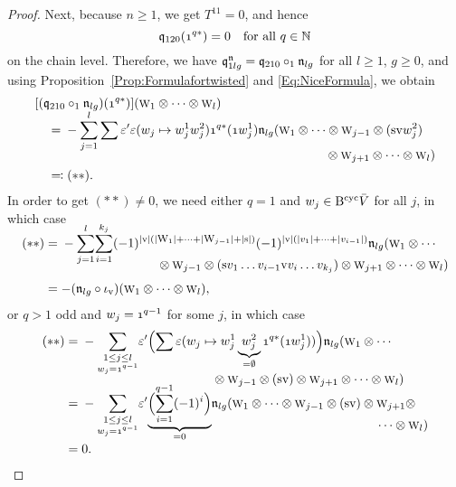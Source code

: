 \documentclass[\MainFolder/Text.tex]{subfiles}
\begin{document}
\begin{proof}
Next, because $n\ge 1$, we get $T^{11} = 0$, and hence 
$$ \OPQ_{120}(\NOne^{q*}) = 0\quad\text{for all }q\in \N$$
on the chain level. Therefore, we have $\mathfrak{q}_{1lg}^{\mathfrak{n}} = \mathfrak{q}_{210}\circ_1 \mathfrak{n}_{lg}$ for all $l\ge 1$, $g\ge 0$, and  using Proposition~\ref{Prop:Formulafortwisted} and \eqref{Eq:NiceFormula}, we obtain 
\allowdisplaybreaks
\begin{align*}
&[(\OPQ_{210}\circ_1 \PMC_{lg})(\NOne^{q*})](\W_1 \otimes \dotsb \otimes \W_l) \\[\jot]
&\quad= \begin{multlined}[t]-\smash{\sum_{j=1}^l} \sum \varepsilon' \varepsilon(w_j \mapsto w_j^1 w_j^2) \NOne^{q*}(\NOne w_j^1) \PMC_{lg}(\W_1 \otimes \dotsb \otimes \W_{j-1} \otimes (\Susp \NVol w_j^2) \\[\jot] \otimes \W_{j+1}\otimes \dotsb \otimes \W_l)\end{multlined}\\
&\quad\eqqcolon(**).
\end{align*}
In order to get $(**)\neq 0$, we need either $q=1$ and $w_j \in \mathrm{B}^{\mathrm{cyc}} \bar{V}$ for all $j$, in which case
\allowdisplaybreaks
\begin{align*}
(**) &= \begin{multlined}[t]-\smash{\sum_{j=1}^l} \smash{\sum_{i=1}^{k_j}} (-1)^{\Abs{\NVol}(\Abs{\W_1}+ \dotsb + \Abs{\W_{j-1}} + \Abs{\Susp})}(-1)^{\Abs{\NVol}(\Abs{v_1} + \dotsb + \Abs{v_{i-1}})}\PMC_{lg}(\W_1 \otimes \dotsb \\[\jot] \otimes \W_{j-1} \otimes (\Susp v_1 \dots v_{i-1} \NVol v_{i} \dots v_{k_j}) \otimes \W_{j+1}\otimes \dotsb\otimes \W_l)\end{multlined} \\[\jot]
 &= -(\PMC_{lg} \circ \iota_\NVol)(\W_1 \otimes \dotsb \otimes \W_l),
\end{align*}
or $q>1$ odd and $w_j = \NOne^{q-1}$ for some $j$, in which case
\allowdisplaybreaks
\begin{align*}
(**) &=\begin{multlined}[t]-\smash{\sum_{\substack{1\le j \le l \\ w_j = \NOne^{q-1}}}} \varepsilon' \Bigl(\sum \varepsilon(w_j \mapsto w_j^1 \underbrace{w_{j}^2}_{=\emptyset} \NOne^{q*}(\NOne w_j^1)) \Bigr) \PMC_{lg}(\W_1\otimes \dotsb \\ \otimes\W_{j-1}\otimes (\Susp\NVol)\otimes \W_{j+1} \otimes \dotsb \otimes \W_l )\end{multlined}\\[\jot]
&=\begin{multlined}[t]-\smash{\sum_{\substack{1\le j \le l \\ w_j = \NOne^{q-1}}}} \varepsilon' \smash{\underbrace{\Bigl( \sum_{i=1}^{q-1} (-1)^i \Bigr)}_{=0}} \PMC_{lg}(\W_1 \otimes \dotsb \otimes \W_{j-1} \otimes (\Susp \NVol) \otimes \W_{j+1} \otimes \\[\jot] \dotsb \otimes \W_l)\end{multlined}\\[\jot]
&=0.
\end{align*}


\end{proof}
\end{document}
